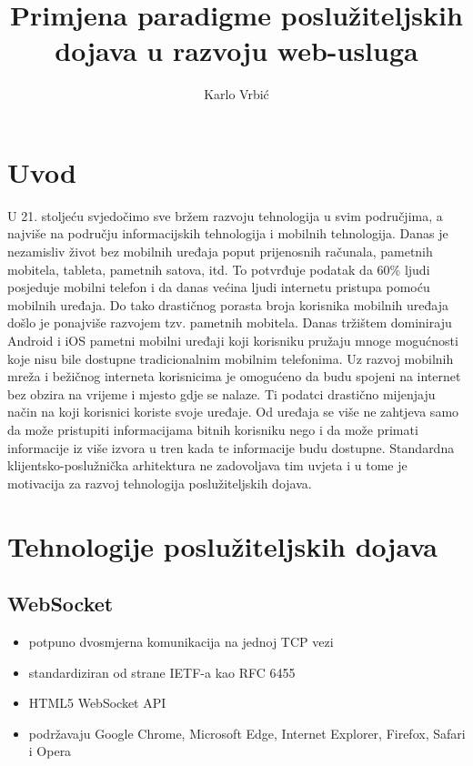 \documentclass[times, utf8, zavrsni]{fer}
\begin{document}
\title{Primjena paradigme poslužiteljskih dojava u razvoju web-usluga}
\author{Karlo Vrbić}

\maketitle

\izvornik

\zahvala{}

\tableofcontents

\chapter{Uvod}
U 21. stoljeću svjedočimo sve bržem razvoju tehnologija u svim područjima, a najviše na području informacijskih tehnologija i mobilnih tehnologija. Danas je nezamisliv život bez mobilnih uređaja poput prijenosnih računala, pametnih mobitela, tableta, pametnih satova, itd. To potvrđuje podatak da 60\% ljudi posjeduje mobilni telefon i da danas većina ljudi internetu pristupa pomoću mobilnih uređaja. Do tako drastičnog porasta broja korisnika mobilnih uređaja došlo je ponajviše razvojem tzv. pametnih mobitela. Danas tržištem dominiraju Android i iOS pametni mobilni uređaji koji korisniku pružaju mnoge mogućnosti koje nisu bile dostupne tradicionalnim mobilnim telefonima. Uz razvoj mobilnih mreža i bežičnog interneta korisnicima je omogućeno da budu spojeni na internet bez obzira na vrijeme i mjesto gdje se nalaze. Ti podatci drastično mijenjaju način na koji korisnici koriste svoje uređaje. Od uređaja se više ne zahtjeva samo da može pristupiti informacijama bitnih korisniku nego i da može primati informacije iz više izvora u tren kada te informacije budu dostupne. Standardna klijentsko-poslužnička arhitektura ne zadovoljava tim uvjeta i u tome je motivacija za razvoj tehnologija poslužiteljskih dojava.


\chapter{Tehnologije poslužiteljskih dojava}

\section{WebSocket}
\begin{itemize}
    \item potpuno dvosmjerna komunikacija na jednoj TCP vezi
    \item standardiziran od strane IETF-a kao RFC 6455
    \item HTML5 WebSocket API
    \item podržavaju Google Chrome, Microsoft Edge, Internet Explorer, Firefox, Safari i Opera
\end{itemize}
\end{document}
